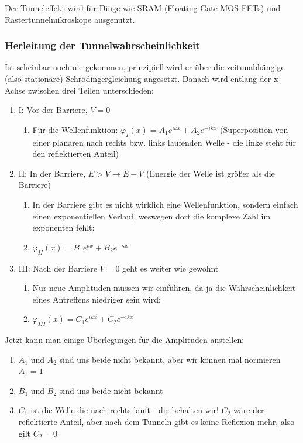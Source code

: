 \documentclass{article}
\begin{document}
Der Tunneleffekt wird für Dinge wie SRAM (Floating Gate MOS-FETs) und Rastertunnelmikroskope ausgenutzt. 

\subsubsection{Herleitung der Tunnelwahrscheinlichkeit}
Ist scheinbar noch nie gekommen, prinzipiell wird er über die zeitunabhängige (also stationäre) Schrödingergleichung angesetzt. 
Danach wird entlang der x-Achse zwischen drei Teilen unterschieden:
\begin{enumerate}
    \item I: Vor der Barriere, $V = 0$
    \begin{enumerate}
        \item Für die Wellenfunktion: $\varphi_I(x) = A_1e^{ikx} + A_2e^{-ikx}$ (Superposition von einer planaren nach rechts bzw. links laufenden Welle - die linke steht für den reflektierten Anteil)
    \end{enumerate}
    \item II: In der Barriere, $E > V \rightarrow E - V$ (Energie der Welle ist größer als die Barriere)
    \begin{enumerate}
        \item In der Barriere gibt es nicht wirklich eine Wellenfunktion, sondern einfach einen exponentiellen Verlauf, weswegen dort die komplexe Zahl im exponenten fehlt:
        \item $\varphi_{II}(x) = B_1e^{\kappa x} + B_2e^{-\kappa x}$
    \end{enumerate}
    \item III: Nach der Barriere $V = 0$ geht es weiter wie gewohnt
    \begin{enumerate}
        \item Nur neue Amplituden müssen wir einführen, da ja die Wahrscheinlichkeit eines Antreffens niedriger sein wird:
        \item $\varphi_{III}(x) = C_1e^{ikx} + C_2e^{-ikx}$
    \end{enumerate}
\end{enumerate}

Jetzt kann man einige Überlegungen für die Amplituden anstellen:
\begin{enumerate}
    \item $A_1$ und $A_2$ sind uns beide nicht bekannt, aber wir können mal normieren $A_1 = 1$
    \item $B_1$ und $B_2$ sind uns beide nicht bekannt
    \item $C_1$ ist die Welle die nach rechts läuft - die behalten wir! $C_2$ wäre der reflektierte Anteil, aber nach dem Tunneln gibt es keine Reflexion mehr, also gilt $C_2 = 0$
\end{enumerate}
\end{document}
